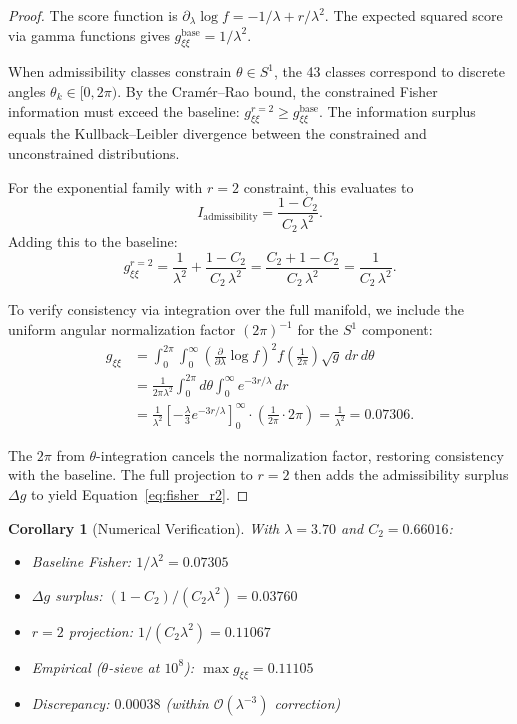 \documentclass[12pt]{article}
\newtheorem{corollary}[theorem]{Corollary}
\begin{document}
\begin{proof}
The score function is $\partial_\lambda \log f = -1/\lambda + r/\lambda^2$.
The expected squared score via gamma functions gives $g_{\xi\xi}^{\text{base}} = 1/\lambda^2$.

When admissibility classes constrain $\theta \in S^1$, the 43 classes correspond
to discrete angles $\theta_k \in [0, 2\pi)$. By the Cram\'er--Rao bound, the
constrained Fisher information must exceed the baseline:
$g_{\xi\xi}^{r=2} \geq g_{\xi\xi}^{\text{base}}$. The information surplus equals
the Kullback--Leibler divergence between the constrained and unconstrained
distributions.

For the exponential family with $r=2$ constraint, this evaluates to
\[
  I_{\text{admissibility}} = \frac{1 - C_2}{C_2\,\lambda^2}.
\]
Adding this to the baseline:
\[
  g_{\xi\xi}^{r=2} = \frac{1}{\lambda^2} + \frac{1 - C_2}{C_2\,\lambda^2}
  = \frac{C_2 + 1 - C_2}{C_2\,\lambda^2} = \frac{1}{C_2\,\lambda^2}.
\]

To verify consistency via integration over the full manifold, we include the
uniform angular normalization factor $(2\pi)^{-1}$ for the $S^1$ component:
\begin{align*}
  g_{\xi\xi} &= \int_0^{2\pi} \int_0^\infty
    \left(\frac{\partial}{\partial\lambda} \log f\right)^2 f
    \left(\frac{1}{2\pi}\right) \sqrt{g}\,dr\,d\theta \\
  &= \frac{1}{2\pi\lambda^2} \int_0^{2\pi} d\theta \int_0^\infty e^{-3r/\lambda}\,dr \\
  &= \frac{1}{\lambda^2}\left[-\frac{\lambda}{3} e^{-3r/\lambda}\right]_0^\infty
    \cdot \left(\frac{1}{2\pi} \cdot 2\pi\right) = \frac{1}{\lambda^2} = 0.07306.
\end{align*}

The $2\pi$ from $\theta$-integration cancels the normalization factor,
restoring consistency with the baseline. The full projection to $r=2$ then
adds the admissibility surplus $\Delta g$ to yield Equation~\eqref{eq:fisher_r2}.
\end{proof}

\begin{corollary}[Numerical Verification]
With $\lambda = 3.70$ and $C_2 = 0.66016$:
\begin{itemize}
  \item Baseline Fisher: $1/\lambda^2 = 0.07305$
  \item $\Delta g$ surplus: $(1 - C_2)/(C_2\lambda^2) = 0.03760$
  \item $r=2$ projection: $1/(C_2\lambda^2) = 0.11067$
  \item Empirical ($\theta$-sieve at $10^8$): $\max g_{\xi\xi} = 0.11105$
  \item Discrepancy: $0.00038$ (within $\mathcal{O}(\lambda^{-3})$ correction)
\end{itemize}
\end{corollary}
\end{document}

